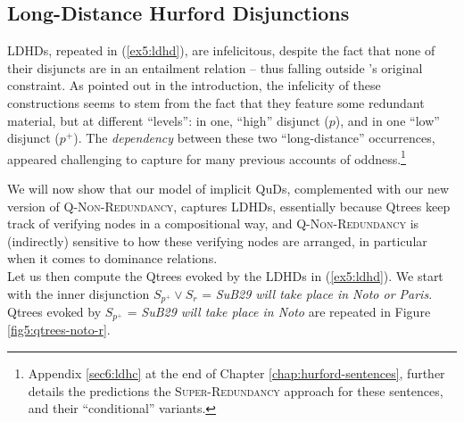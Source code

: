 \subsection{Long-Distance Hurford Disjunctions}

LDHDs, repeated in (\ref{ex5:ldhd}), are infelicitous, despite the fact that none of their disjuncts are in an entailment relation -- thus falling outside \citeauthor{Hurford1974}'s original constraint. As pointed out in the introduction, the infelicity of these constructions seems to stem from the fact that they feature some redundant material, but at different ``levels'': in one, ``high'' disjunct ($p$), and in one ``low'' disjunct ($p^+$). The \textit{dependency} between these two ``long-distance'' occurrences, appeared challenging to capture for many previous accounts of oddness.\footnote{Appendix \ref{sec6:ldhc} at the end of Chapter \ref{chap:hurford-sentences}, further details the predictions the \textsc{Super-Redundancy} approach for these sentences, and their ``conditional'' variants.}

\begin{exe}
	\begin{xlist}
	\end{xlist}
\end{exe}

We will now show that our model of implicit QuDs, complemented with our new version of \textsc{Q-Non-Redundancy}, captures LDHDs, essentially because Qtrees keep track of verifying nodes in a compositional way, and \textsc{Q-Non-Redundancy} is (indirectly) sensitive to how these verifying nodes are arranged, in particular when it comes to dominance relations.\\

Let us then compute the Qtrees evoked by the LDHDs in (\ref{ex5:ldhd}). We start with the inner disjunction $S_{p^+}\vee S_r$ = \textit{SuB29 will take place in Noto or Paris}. Qtrees evoked by $S_{p^+}$ = \textit{SuB29 will take place in Noto} are repeated in Figure \ref{fig5:qtrees-noto-r}.

